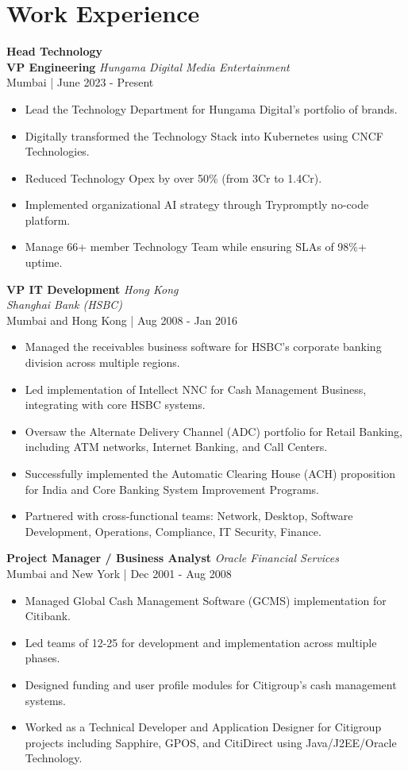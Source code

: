 \documentclass[a4paper,10pt]{article}
\begin{document}
\section*{Work Experience}
\textbf{Head Technology \\ VP Engineering} \hfill \textit{Hungama Digital Media Entertainment} \\
Mumbai | June 2023 - Present
\begin{itemize}[leftmargin=0.5cm]
    \item Lead the Technology Department for Hungama Digital’s portfolio of brands.
    \item Digitally transformed the Technology Stack into Kubernetes using CNCF Technologies.
    \item Reduced Technology Opex by over 50\% (from 3Cr to 1.4Cr).
    \item Implemented organizational AI strategy through Trypromptly no-code platform.
    \item Manage 66+ member Technology Team while ensuring SLAs of 98\%+ uptime.
\end{itemize}

\textbf{VP IT Development} \hfill \textit{Hong Kong \\ Shanghai Bank (HSBC)} \\
Mumbai and Hong Kong | Aug 2008 - Jan 2016
\begin{itemize}[leftmargin=0.5cm]
    \item Managed the receivables business software for HSBC's corporate banking division across multiple regions.
    \item Led implementation of Intellect NNC for Cash Management Business, integrating with core HSBC systems.
    \item Oversaw the Alternate Delivery Channel (ADC) portfolio for Retail Banking, including ATM networks, Internet Banking, and Call Centers.
    \item Successfully implemented the Automatic Clearing House (ACH) proposition for India and Core Banking System Improvement Programs.
    \item Partnered with cross-functional teams: Network, Desktop, Software Development, Operations, Compliance, IT Security, Finance.
\end{itemize}

\textbf{Project Manager / Business Analyst} \hfill \textit{Oracle Financial Services} \\
Mumbai and New York | Dec 2001 - Aug 2008
\begin{itemize}[leftmargin=0.5cm]
    \item Managed Global Cash Management Software (GCMS) implementation for Citibank.
    \item Led teams of 12-25 for development and implementation across multiple phases.
    \item Designed funding and user profile modules for Citigroup’s cash management systems.
    \item Worked as a Technical Developer and Application Designer for Citigroup projects including Sapphire, GPOS, and CitiDirect using Java/J2EE/Oracle Technology.
\end{itemize}
\end{document}
